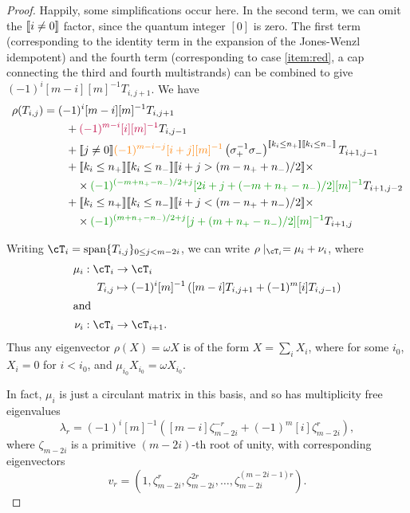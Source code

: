 \documentclass[12pt]{article}
\begin{document}
\begin{proof}
Happily, some simplifications occur here. In the second term, we can omit the $[\![ i\neq0 ]\!]$ factor, since the quantum integer $[0]$ is zero. The first term (corresponding to the identity term in the expansion of the Jones-Wenzl idempotent) and the fourth term (corresponding to case \eqref{item:red}, a cap connecting the third and fourth multistrands) can be combined to give $(-1)^i [m-i][m]^{-1} T_{i,j+1}$. We have
\begin{align*}
\rho(T_{i,j}) & =
(-1)^i[m-i][m]^{-1} T_{i, j + 1} \\
& \qquad +
\textcolor{purple}{(-1)^{m-i} [i][m]^{-1}} T_{i,j-1} \\
& \qquad +
\truth{j \neq 0}\textcolor{orange}{(-1)^{m-i-j} [i+j][m]^{-1}} \left(\sigma_+^{-1} \sigma_-\right)^{\truth{k_i \leq n_+} \truth{k_i \leq n_-}} T_{i+1, j-1} \\
& \qquad +
\truth{k_i \leq n_+} \truth{k_i \leq n_-}
\truth{i+j > (m - n_+ + n_-)/2} \times \\
& \qquad \quad \times \textcolor{DarkGreen}{(-1)^{(-m + n_+ - n_-)/2 + j} [2i + j + (-m + n_+ - n_-)/2][m]^{-1}} T_{i+1,j-2} \\
& \qquad +
\truth{k_i \leq n_+} \truth{k_i \leq n_-}
\truth{i+j < (m - n_+ + n_-)/2} \times \\
& \qquad \quad \times \textcolor{DarkGreen}{(-1)^{(m + n_+ - n_-)/2 + j} [j+ (m + n_+ - n_-)/2 ][m]^{-1}} T_{i+1,j}
\end{align*}


Writing $\cT_i = \Span \{ T_{i,j} \}_{0 \leq j < m- 2i}$, we can write $\rho \mid_{\cT_i} = \mu_i + \nu_i$, where
\begin{align*}
\mu_i :  \cT_i & \to \cT_i \\
  T_{i,j} & \mapsto (-1)^i [m]^{-1} \left( [m-i] T_{i,j+1} + (-1)^{m}[i] T_{i,j-1}\right) \\
\intertext{and}
\nu_i : \cT_i & \to \cT_{i+1}.
\end{align*}
Thus any eigenvector $\rho(X) = \omega X$ is of the form $X = \sum_i X_i$, where for some $i_0$, $X_i = 0$ for $i < i_0$, and $\mu_{i_0} X_{i_0} = \omega X_{i_0}$.

In fact, $\mu_i$ is just a circulant matrix in this basis, and so has multiplicity free eigenvalues
$$\lambda_r = (-1)^i[m]^{-1} \left([m-i] \zeta_{m-2i}^{-r} + (-1)^{m}[i] \zeta_{m-2i}^r\right),$$
where $\zeta_{m-2i}$ is a primitive $(m-2i)$-th root of unity, with corresponding eigenvectors
$$v_r = \left(1, \zeta_{m-2i}^r , \zeta_{m-2i}^{2r} , \ldots, \zeta_{m-2i}^{(m-2i-1)r} \right).$$


\end{proof}
\end{document}
